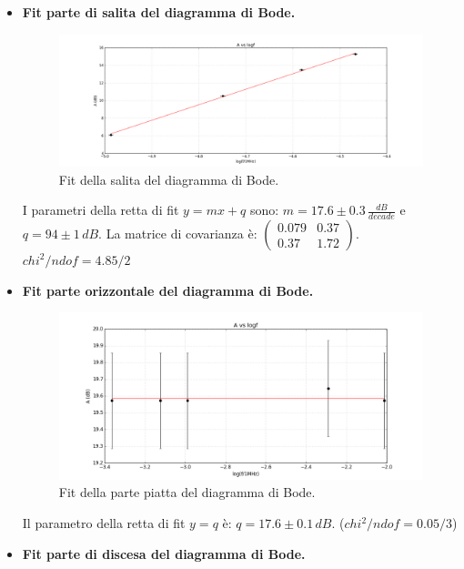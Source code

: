 \documentclass[10pt,a4paper]{article}
\begin{document}
\begin{itemize}
\item \textbf{Fit parte di salita del diagramma di Bode.}

\begin{figure}[!htb]
  \centering
  \includegraphics[scale=0.5]{salita.png}
\caption{Fit della salita del diagramma di Bode.}
\label{salita}
\end{figure}

I parametri della retta di fit $y = mx+q$ sono: $m = 17.6 \pm 0.3 \, \frac{dB}{decade}$ e $q = 94 \pm 1 \, dB$. La matrice di covarianza è:
$\left( \begin{array}{cc}
0.079 & 0.37 \\ 
0.37 & 1.72
\end{array} \right)$.\\
$chi^2/ndof = 4.85/2$

\item \textbf{Fit parte orizzontale del diagramma di Bode.}

\begin{figure}[!htb]
  \centering
  \includegraphics[scale=1.0]{orizzontale.png}
\caption{Fit della parte piatta del diagramma di Bode.}
\label{orizz}
\end{figure}

Il parametro della retta di fit $y = q$ è: $q = 17.6 \pm 0.1 \, dB$. ($chi^2/ndof = 0.05/3$)

\item \textbf{Fit parte di discesa del diagramma di Bode.}


\end{itemize}
\end{document}
